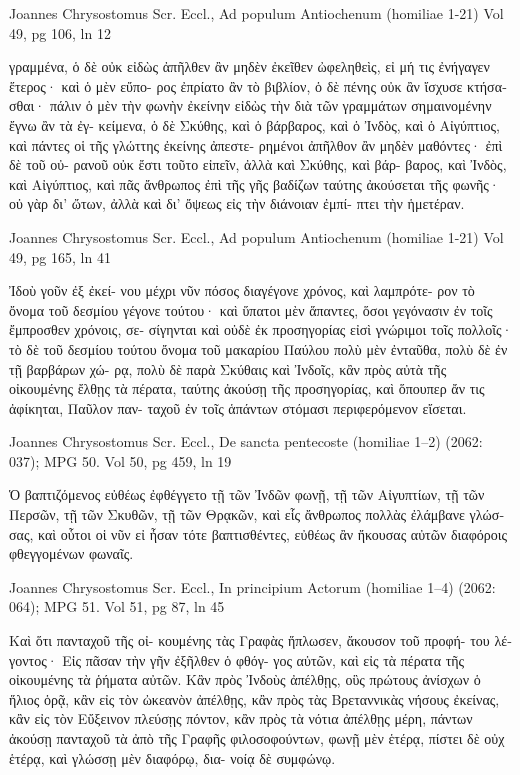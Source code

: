 \documentclass[12pt,letterpaper,twoside,final]{memoir}
\begin{document}
\begin{greek}
Joannes Chrysostomus Scr. Eccl., Ad populum Antiochenum (homiliae 1-21) 
Vol 49, pg 106, ln 12

γραμμένα, ὁ δὲ οὐκ εἰδὼς ἀπῆλθεν ἂν μηδὲν ἐκεῖθεν 
ὠφεληθεὶς, εἰ μή τις ἐνήγαγεν ἕτερος· καὶ ὁ μὲν εὔπο-
ρος ἐπρίατο ἂν τὸ βιβλίον, ὁ δὲ πένης οὐκ ἂν ἴσχυσε 
κτήσασθαι· πάλιν ὁ μὲν τὴν φωνὴν ἐκείνην εἰδὼς τὴν 
διὰ τῶν γραμμάτων σημαινομένην ἔγνω ἂν τὰ ἐγ-
κείμενα, ὁ δὲ Σκύθης, καὶ ὁ βάρβαρος, καὶ ὁ Ἰνδὸς, καὶ 
ὁ Αἰγύπτιος, καὶ πάντες οἱ τῆς γλώττης ἐκείνης ἀπεστε-
ρημένοι ἀπῆλθον ἂν μηδὲν μαθόντες· ἐπὶ δὲ τοῦ οὐ-
ρανοῦ οὐκ ἔστι τοῦτο εἰπεῖν, ἀλλὰ καὶ Σκύθης, καὶ βάρ-
βαρος, καὶ Ἰνδὸς, καὶ Αἰγύπτιος, καὶ πᾶς ἄνθρωπος 
ἐπὶ τῆς γῆς βαδίζων ταύτης ἀκούσεται τῆς φωνῆς· οὐ 
γὰρ δι' ὤτων, ἀλλὰ καὶ δι' ὄψεως εἰς τὴν διάνοιαν ἐμπί-
πτει τὴν ἡμετέραν. 



Joannes Chrysostomus Scr. Eccl., Ad populum Antiochenum (homiliae 1-21) 
Vol 49, pg 165, ln 41

                                              Ἰδοὺ γοῦν ἐξ ἐκεί-
νου μέχρι νῦν πόσος διαγέγονε χρόνος, καὶ λαμπρότε-
ρον τὸ ὄνομα τοῦ δεσμίου γέγονε τούτου· καὶ ὕπατοι μὲν 
ἅπαντες, ὅσοι γεγόνασιν ἐν τοῖς ἔμπροσθεν χρόνοις, σε-
σίγηνται καὶ οὐδὲ ἐκ προσηγορίας εἰσὶ γνώριμοι τοῖς 
πολλοῖς· τὸ δὲ τοῦ δεσμίου τούτου ὄνομα τοῦ μακαρίου 
Παύλου πολὺ μὲν ἐνταῦθα, πολὺ δὲ ἐν τῇ βαρβάρων χώ-
ρᾳ, πολὺ δὲ παρὰ Σκύθαις καὶ Ἰνδοῖς, κἂν πρὸς αὐτὰ 
τῆς οἰκουμένης ἔλθῃς τὰ πέρατα, ταύτης ἀκούσῃ τῆς 
προσηγορίας, καὶ ὅπουπερ ἄν τις ἀφίκηται, Παῦλον παν-
ταχοῦ ἐν τοῖς ἁπάντων στόμασι περιφερόμενον εἴσεται. 



Joannes Chrysostomus Scr. Eccl., De sancta pentecoste (homiliae 1–2) (2062: 037); MPG 50.
Vol 50, pg 459, ln 19

                   Ὁ βαπτιζόμενος εὐθέως ἐφθέγγετο 
τῇ τῶν Ἰνδῶν φωνῇ, τῇ τῶν Αἰγυπτίων, τῇ τῶν 
Περσῶν, τῇ τῶν Σκυθῶν, τῇ τῶν Θρᾳκῶν, καὶ εἷς 
ἄνθρωπος πολλὰς ἐλάμβανε γλώσσας, καὶ οὗτοι οἱ 
νῦν εἰ ἦσαν τότε βαπτισθέντες, εὐθέως ἂν ἤκουσας 
αὐτῶν διαφόροις φθεγγομένων φωναῖς. 



Joannes Chrysostomus Scr. Eccl., In principium Actorum (homiliae 1–4) (2062: 064); MPG 51.
Vol 51, pg 87, ln 45

                              Καὶ ὅτι πανταχοῦ τῆς οἰ-
κουμένης τὰς Γραφὰς ἥπλωσεν, ἄκουσον τοῦ προφή-
του λέγοντος· Εἰς πᾶσαν τὴν γῆν ἐξῆλθεν ὁ φθόγ-
γος αὐτῶν, καὶ εἰς τὰ πέρατα τῆς οἰκουμένης τὰ 
ῥήματα αὐτῶν. Κἂν πρὸς Ἰνδοὺς ἀπέλθῃς, οὓς 
πρώτους ἀνίσχων ὁ ἥλιος ὁρᾷ, κἂν εἰς τὸν ὠκεανὸν 
ἀπέλθῃς, κἂν πρὸς τὰς Βρεταννικὰς νήσους ἐκείνας, 
κἂν εἰς τὸν Εὔξεινον πλεύσῃς πόντον, κἂν πρὸς τὰ 
νότια ἀπέλθῃς μέρη, πάντων ἀκούσῃ πανταχοῦ τὰ 
ἀπὸ τῆς Γραφῆς φιλοσοφούντων, φωνῇ μὲν ἑτέρᾳ,    
πίστει δὲ οὐχ ἑτέρᾳ, καὶ γλώσσῃ μὲν διαφόρῳ, δια-
νοίᾳ δὲ συμφώνῳ. 




\end{greek}
\end{document}
